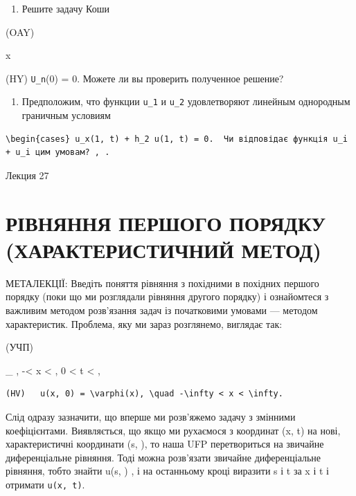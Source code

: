 \documentclass[
  ukrainian,
]{article}
\providecommand{\tightlist}{%
  \setlength{\itemsep}{0pt}\setlength{\parskip}{0pt}}
\begin{document}
\begin{enumerate}
\def\labelenumi{\arabic{enumi}.}
\setcounter{enumi}{4}
\tightlist
\item
  Решите задачу Коши
\end{enumerate}

(OAY)

x

(HY) \texttt{U\_n}(0) = 0. Можете ли вы проверить полученное решение?

\begin{enumerate}
\def\labelenumi{\arabic{enumi}.}
\setcounter{enumi}{5}
\tightlist
\item
  Предположим, что функции \texttt{u\_1} и \texttt{u\_2} удовлетворяют
  линейным однородным граничным условиям
\end{enumerate}

\begin{verbatim}
\begin{cases} u_x(1, t) + h_2 u(1, t) = 0.  Чи відповідає функція u_i + u_i цим умовам? , .
\end{verbatim}

Лекция 27

\section{РІВНЯННЯ ПЕРШОГО ПОРЯДКУ (ХАРАКТЕРИСТИЧНИЙ
МЕТОД)}\label{ux440ux456ux432ux43dux44fux43dux43dux44f-ux43fux435ux440ux448ux43eux433ux43e-ux43fux43eux440ux44fux434ux43aux443-ux445ux430ux440ux430ux43aux442ux435ux440ux438ux441ux442ux438ux447ux43dux438ux439-ux43cux435ux442ux43eux434}

МЕТАЛЕКЦІЇ: Введіть поняття рівняння з похідними в похідних першого
порядку (поки що ми розглядали рівняння другого порядку) і ознайомтеся з
важливим методом розв'язання задач із початковими умовами --- методом
характеристик. Проблема, яку ми зараз розглянемо, виглядає так:

(УЧП)

\_ \textbar, -\infty \textless{} x \textless{} \infty  , 0 \textless{} t
\textless{} \infty  ,

\begin{verbatim}
(HV)   u(x, 0) = \varphi(x), \quad -\infty < x < \infty.
\end{verbatim}

Слід одразу зазначити, що вперше ми розв'яжемо задачу з змінними
коефіцієнтами. Виявляється, що якщо ми рухаємося з координат (x, t) на
нові, характеристичні координати (s, \tau), то наша UFP перетвориться на
звичайне диференціальне рівняння. Тоді можна розв'язати звичайне
диференціальне рівняння, тобто знайти u(s, \tau) , і на останньому кроці
виразити s і t за x і t і отримати \texttt{u(x,\ t)}.
\end{document}
